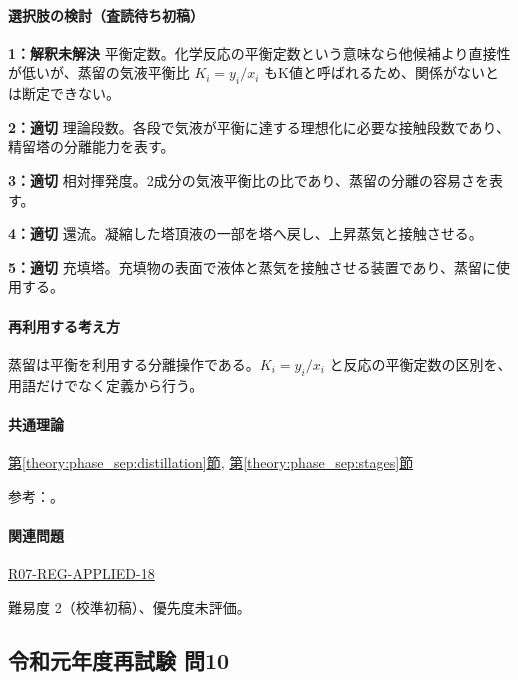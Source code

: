 \paragraph{選択肢の検討（査読待ち初稿）}\mbox{}\par

\noindent\textbf{1：解釈未解決} 平衡定数。化学反応の平衡定数という意味なら他候補より直接性が低いが、蒸留の気液平衡比 \(K_i=y_i/x_i\) もK値と呼ばれるため、関係がないとは断定できない。\par

\noindent\textbf{2：適切} 理論段数。各段で気液が平衡に達する理想化に必要な接触段数であり、精留塔の分離能力を表す。\par

\noindent\textbf{3：適切} 相対揮発度。2成分の気液平衡比の比であり、蒸留の分離の容易さを表す。\par

\noindent\textbf{4：適切} 還流。凝縮した塔頂液の一部を塔へ戻し、上昇蒸気と接触させる。\par

\noindent\textbf{5：適切} 充填塔。充填物の表面で液体と蒸気を接触させる装置であり、蒸留に使用する。\par

\paragraph{再利用する考え方} 蒸留は平衡を利用する分離操作である。\(K_i=y_i/x_i\) と反応の平衡定数の区別を、用語だけでなく定義から行う。

\paragraph{共通理論} \hyperref[theory:phase_sep:distillation]{第\ref*{theory:phase_sep:distillation}節}, \hyperref[theory:phase_sep:stages]{第\ref*{theory:phase_sep:stages}節}

\par 参考：\cite{nptel_distillation1}。

\paragraph{関連問題} \hyperref[q:r07-reg-applied-18]{R07-REG-APPLIED-18}

\par 難易度 2（校準初稿）、優先度未評価。

\subsection{令和元年度再試験 問10}
\label{q:r01-ret-applied-10}

